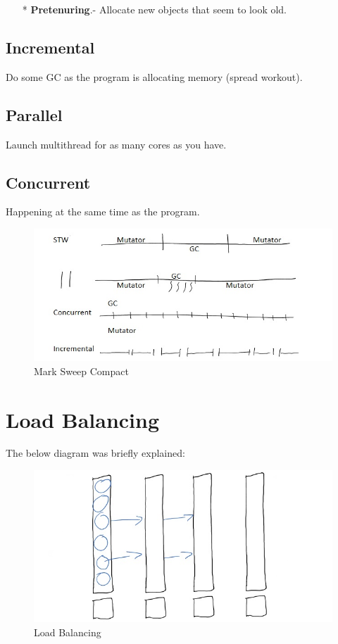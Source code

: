\documentclass[twoside]{article}
\begin{document}
\begin{itemize}
	\item[*] \textbf{Pretenuring}.- Allocate new objects that seem to look old.
\end{itemize}

\subsection{Incremental}

Do some GC as the program is allocating memory (spread workout). 

\subsection{Parallel}

Launch multithread for as many cores as you have.


\subsection{Concurrent}

Happening at the same time as the program.

\begin{figure}[ht!]
\center
\includegraphics[width=150mm]{Types_GC.jpg}
\caption{ Mark Sweep Compact \label{typesGC}}
\end{figure}

\pagebreak

\section{Load Balancing}

The below diagram was briefly explained:

\begin{figure}[ht!]
\center
\includegraphics[width=150mm]{Load_Balancing.jpg}
\caption{ Load Balancing \label{loadBalancing}}
\end{figure}
\end{document}
